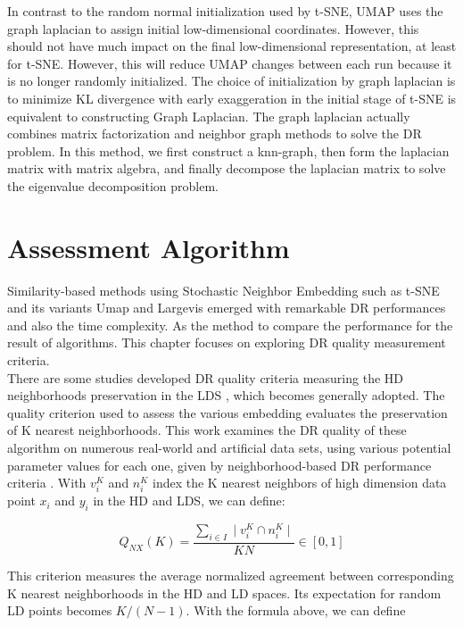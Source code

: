 \noindent In contrast to the random normal initialization used by t-SNE, UMAP uses the graph laplacian to assign initial low-dimensional coordinates. However, this should not have much impact on the final low-dimensional representation, at least for t-SNE. However, this will reduce UMAP changes between each run because it is no longer randomly initialized. The choice of initialization by graph laplacian is to minimize KL divergence with early exaggeration in the initial stage of t-SNE is equivalent to constructing Graph Laplacian. The graph laplacian actually combines matrix factorization and neighbor graph methods to solve the DR problem. In this method, we first construct a knn-graph, then form the laplacian matrix with matrix algebra, and finally decompose the laplacian matrix to solve the eigenvalue decomposition problem.\\

\chapter{Assessment Algorithm}

Similarity-based methods using Stochastic Neighbor Embedding such as t-SNE and its variants Umap and Largevis emerged with remarkable DR performances and also the time complexity. As the method to compare the performance for the result of algorithms. This chapter focuses on exploring DR quality measurement criteria. \\

\noindent There are some studies developed DR quality criteria measuring the HD neighborhoods preservation in the LDS \cite{ref10}, which becomes generally adopted. The quality criterion used to assess the various embedding evaluates the preservation of K nearest neighborhoods\cite{ref4}. This work examines the DR quality of these algorithm on numerous real-world and artificial data sets\cite{ref8}, using various potential parameter values for each one, given by neighborhood-based DR performance criteria \cite{ref9}. With $v^K_i$ and $n^K_i$ index the K nearest neighbors of high dimension data point $x_i$ and $y_i$ in the HD and LDS, we can define:

\begin{equation*}
    Q_{NX} (K) = \frac{ \sum_{i \in I} \mid v^K_i \cap n^K_i \mid }{ KN}  \in [0,1]
\end{equation*}

\noindent This criterion measures the average normalized agreement between corresponding K nearest neighborhoods in the HD and LD spaces\cite{ref18}. Its expectation for random LD points becomes $K/ (N − 1)$. With the formula above, we can define


